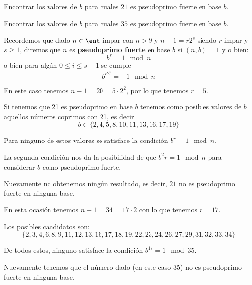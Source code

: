 \begin{problem}[15]
\ppart Encontrar los valores de $b$ para cuales $21$ es
pseudoprimo fuerte en base $b$.

\ppart  Encontrar los valores de $b$ para cuales $35$ es
pseudoprimo fuerte en base $b$.

\solution


Recordemos que dado $n \in \ent$ impar con $n>9$ y $n-1=r2^s$ siendo $r$ impar y $s \geq 1$, diremos que $n$ es \textbf{pseudoprimo fuerte} en base $b$ si $(n,b)=1$ y o bien:
\[b^r=1 \mod n\]
o bien para algún $0 \leq i \leq s-1$ se cumple
\[b^{r2^i}=-1\mod n\]

\spart

En este caso tenemos $n-1=20 =5\cdot 2^2$, por lo que tenemos $r=5$.

Si tenemos que 21 es pseudoprimo en base $b$ tenemos como posibles valores de $b$ aquellos números coprimos con 21, es decir
\[b\in \{2,4,5,8,10,11,13,16,17,19\}\]

Para ninguno de estos valores se satisface la condición $b^r=1 \mod n$.

La segunda condición nos da la posibilidad de que $b^2r=1 \mod n$ para considerar $b$ como pseudoprimo fuerte.

Nuevamente no obtenemos ningún resultado, es decir, $21$ no es pseudoprimo fuerte en ninguna base.

\spart

En esta ocasión tenemos $n-1=34=17\cdot 2$ con lo que tenemos $r=17$.

Los posibles candidatos son:
\[\{2,3,4,6,8,9,11,12,13,16,17,18,19,22,23,24,26,27,29,31,32,33,34\}\]

De todos estos, ninguno satisface la condición $b^{17} =1 \mod 35$.

Nuevamente tenemos que el número dado (en este caso 35) no es pseudoprimo fuerte en ninguna base.
\end{problem}

